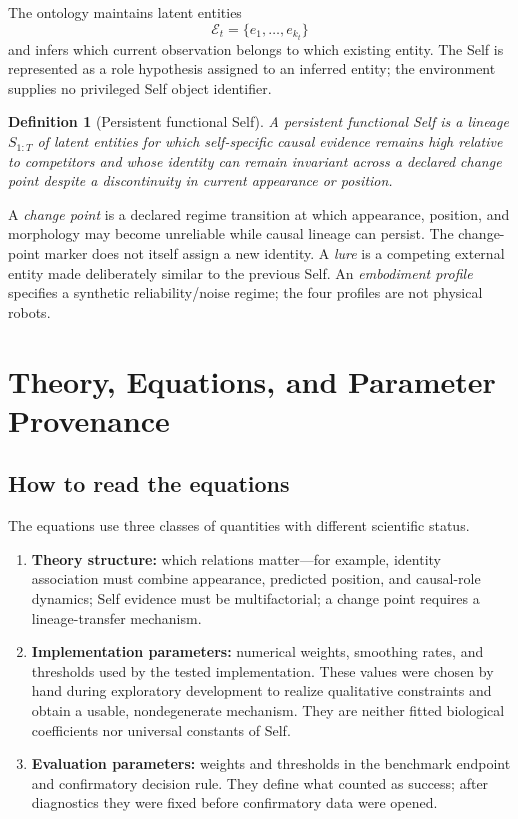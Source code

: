 \documentclass[journal]{IEEEtran}
\newtheorem{definition}{Definition}
\begin{document}
The ontology maintains latent entities
\begin{equation}
\mathcal E_t=\{e_1,\ldots,e_{k_t}\}
\label{eq:entities}
\end{equation}
and infers which current observation belongs to which existing entity. The Self is represented as a role hypothesis assigned to an inferred entity; the environment supplies no privileged Self object identifier.

\begin{definition}[Persistent functional Self]
A persistent functional Self is a lineage $S_{1:T}$ of latent entities for which self-specific causal evidence remains high relative to competitors and whose identity can remain invariant across a declared change point despite a discontinuity in current appearance or position.
\end{definition}

A \emph{change point} is a declared regime transition at which appearance, position, and morphology may become unreliable while causal lineage can persist. The change-point marker does not itself assign a new identity. A \emph{lure} is a competing external entity made deliberately similar to the previous Self. An \emph{embodiment profile} specifies a synthetic reliability/noise regime; the four profiles are not physical robots.

\section{Theory, Equations, and Parameter Provenance}
\subsection{How to read the equations}
The equations use three classes of quantities with different scientific status.

\begin{enumerate}
\item \textbf{Theory structure:} which relations matter---for example, identity association must combine appearance, predicted position, and causal-role dynamics; Self evidence must be multifactorial; a change point requires a lineage-transfer mechanism.
\item \textbf{Implementation parameters:} numerical weights, smoothing rates, and thresholds used by the tested implementation. These values were chosen by hand during exploratory development to realize qualitative constraints and obtain a usable, nondegenerate mechanism. They are neither fitted biological coefficients nor universal constants of Self.
\item \textbf{Evaluation parameters:} weights and thresholds in the benchmark endpoint and confirmatory decision rule. They define what counted as success; after diagnostics they were fixed before confirmatory data were opened.
\end{enumerate}
\end{document}
